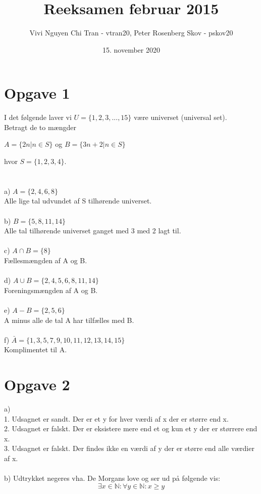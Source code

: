 \documentclass{article}
\title{Reeksamen februar 2015}
\author{Vivi Nguyen Chi Tran - vtran20, Peter Rosenberg Skov - pskov20}
\date{15. november 2020}
\begin{document}
\maketitle
\newpage
\section*{Opgave 1}
I det følgende laver vi $U = \{1,2,3,...,15\}$ være universet (universal set).\\
Betragt de to mængder
\begin{center}
$A = \{2n | n \in S\}$ og $B = \{3n + 2 | n \in S\}  $
\end{center}
hvor $S = \{1,2,3,4\}.$\\
\\
\\
a) $A = \{2,4,6,8\}$\\
Alle lige tal udvundet af S tilhørende universet.
\\
\\
b) $B = \{5,8,11,14\}$\\
Alle tal tilhørende universet ganget med 3 med 2 lagt til.
\\
\\
c) $A \cap B = \{8\}$\\
Fællesmængden af A og B.
\\
\\
d) $A \cup B = \{2,4,5,6,8,11,14\}$\\
Foreningsmængden af A og B.
\\
\\
e) $A - B = \{2,5,6\}$\\
A minus alle de tal A har tilfælles med B.
\\
\\
f) $\bar{A} = \{1,3,5,7,9,10,11,12,13,14,15\}$ \\
Komplimentet til A.

\section*{Opgave 2}
a)
\\
1. Udsagnet er sandt. Der er et y for hver værdi af x der er større end x.
\\
2. Udsagnet er falskt. Der er eksistere mere end et og kun et y der er størrere end x.
\\
3. Udsagnet er falskt. Der findes ikke en værdi af y der er større end alle værdier af x.
\\
\\
b) Udtrykket negeres vha. De Morgans love og ser ud på følgende vis: \\
$$\exists x \in \mathbb{N}: \forall y \in \mathbb{N}: x \geq y
$$
\end{document}
